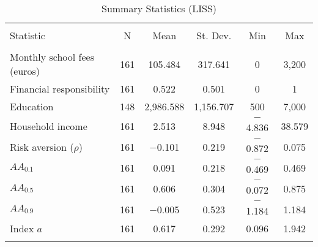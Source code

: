 
\begin{table}[!htbp] \centering 
  \caption{Summary Statistics (LISS)} 
  \label{} 
\begin{tabular}{@{\extracolsep{5pt}}lccccc} 
\\[-1.8ex]\hline 
\hline \\[-1.8ex] 
Statistic & \multicolumn{1}{c}{N} & \multicolumn{1}{c}{Mean} & \multicolumn{1}{c}{St. Dev.} & \multicolumn{1}{c}{Min} & \multicolumn{1}{c}{Max} \\ 
\hline \\[-1.8ex] 
Monthly school fees (euros) & 161 & 105.484 & 317.641 & 0 & 3,200 \\ 
Financial responsibility & 161 & 0.522 & 0.501 & 0 & 1 \\ 
Education & 148 & 2,986.588 & 1,156.707 & 500 & 7,000 \\ 
Household income & 161 & 2.513 & 8.948 & $-$4.836 & 38.579 \\ 
Risk aversion ($\rho$) & 161 & $-$0.101 & 0.219 & $-$0.872 & 0.075 \\ 
$AA_{0.1}$ & 161 & 0.091 & 0.218 & $-$0.469 & 0.469 \\ 
$AA_{0.5}$ & 161 & 0.606 & 0.304 & $-$0.072 & 0.875 \\ 
$AA_{0.9}$ & 161 & $-$0.005 & 0.523 & $-$1.184 & 1.184 \\ 
Index $a$ & 161 & 0.617 & 0.292 & 0.096 & 1.942 \\ 
\hline \\[-1.8ex] 
\end{tabular} 
\end{table} 
